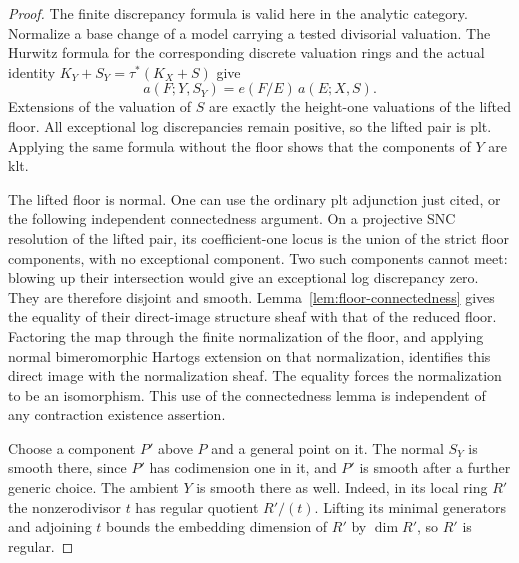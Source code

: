\begin{proof}
The finite discrepancy formula is valid here in the analytic category.
Normalize a base change of a model carrying a tested divisorial valuation.
The Hurwitz formula for the corresponding discrete valuation rings and
the actual identity \(K_Y+S_Y=\tau^*(K_X+S)\) give
\begin{equation}\label{eq:cover-discrepancy}
 a(F;Y,S_Y)=e(F/E)\,a(E;X,S).
\end{equation}
Extensions of the valuation of \(S\) are exactly the height-one
valuations of the lifted floor.  All exceptional log discrepancies
remain positive, so the lifted pair is plt.  Applying the same formula
without the floor shows that the components of \(Y\) are klt.

The lifted floor is normal.  One can use the ordinary plt adjunction just
cited, or the following independent connectedness argument.  On a
projective SNC resolution of the lifted pair, its coefficient-one locus
is the union of the strict floor components, with no exceptional
component.  Two such components cannot meet: blowing up their
intersection would give an exceptional log discrepancy zero.  They
are therefore disjoint and smooth.  Lemma~\ref{lem:floor-connectedness}
gives the equality of their direct-image structure sheaf with that of
the reduced floor.  Factoring the map through the finite normalization
of the floor, and applying normal bimeromorphic Hartogs extension on
that normalization, identifies this direct image with the normalization
sheaf.  The equality forces the normalization to be an isomorphism.
This use of the connectedness lemma is independent of any contraction
existence assertion.

Choose a component \(P'\) above \(P\) and a general point on it.
The normal \(S_Y\) is smooth there, since \(P'\) has codimension one
in it, and \(P'\) is smooth after a further generic choice.  The ambient
\(Y\) is smooth there as well.  Indeed, in its local ring \(R'\) the
nonzerodivisor \(t\) has regular quotient \(R'/(t)\).  Lifting its
minimal generators and adjoining \(t\) bounds the embedding dimension
of \(R'\) by \(\dim R'\), so \(R'\) is regular.


\end{proof}
